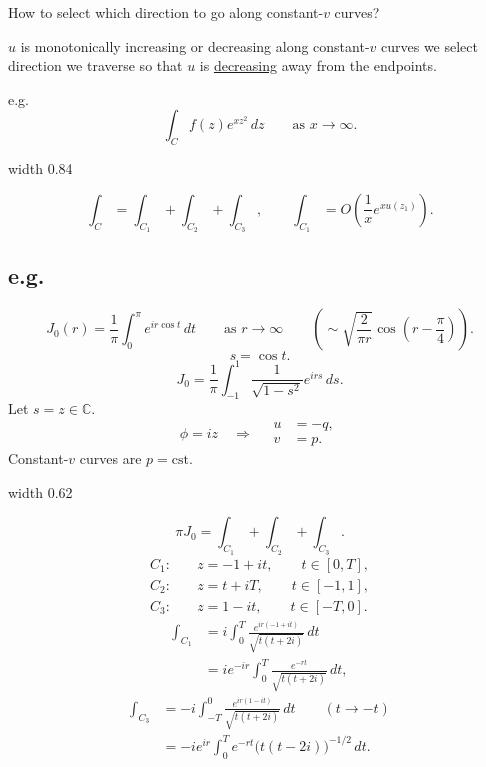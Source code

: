 \documentclass[11pt,a4paper]{article}
\begin{document}
\medskip
\noindent How to select which direction to go along constant-$v$ curves?

$u$ is monotonically increasing or decreasing along constant-$v$ curves
we select direction we traverse so that $u$ is \underline{decreasing}
away from the endpoints.

\clearpage
\medskip
\noindent e.g.
\[
    \int_C f(z)e^{xz^2}\,dz
    \qquad \text{as }x\to\infty.
\]
\begin{center}
    \pdfximage width 0.84\linewidth {figures/asymptotic-lecture9/source-06.png}
    \leavevmode\pdfrefximage\pdflastximage
\end{center}
\[
    \int_C=\int_{C_1}+\int_{C_2}+\int_{C_3},
    \qquad
    \int_{C_1}=O\!\left(\frac1x e^{xu(z_1)}\right).
\]

\clearpage
\subsection*{e.g.}
\[
    J_0(r)=\frac1\pi\int_0^\pi e^{ir\cos t}\,dt
    \qquad \text{as }r\to\infty
    \qquad
    \left(\sim\sqrt{\frac2{\pi r}}\cos\!\left(r-\frac\pi4\right)\right).
\]
\[
    s=\cos t.
\]
\[
    J_0=\frac1\pi\int_{-1}^1\frac1{\sqrt{1-s^2}}e^{irs}\,ds.
\]
Let $s=z\in\mathbb C$.
\[
    \phi=iz\quad\Rightarrow\quad
    \begin{aligned}
        u&=-q,\\
        v&=p.
    \end{aligned}
\]
Constant-$v$ curves are $p=\mathrm{cst}$.

\begin{center}
    \pdfximage width 0.62\linewidth {figures/asymptotic-lecture9/bessel-contour.png}
    \leavevmode\pdfrefximage\pdflastximage
\end{center}
\[
    \pi J_0=\int_{C_1}+\int_{C_2}+\int_{C_3}.
\]
\begin{align*}
    C_1:&\quad z=-1+it,\qquad t\in[0,T],\\
    C_2:&\quad z=t+iT,\qquad t\in[-1,1],\\
    C_3:&\quad z=1-it,\qquad t\in[-T,0].
\end{align*}
\begin{align*}
    \int_{C_1}
    &=i\int_0^T\frac{e^{ir(-1+it)}}{\sqrt{t(t+2i)}}\,dt\\
    &=i e^{-ir}\int_0^T\frac{e^{-rt}}{\sqrt{t(t+2i)}}\,dt,
\end{align*}
\begin{align*}
    \int_{C_3}
    &=-i\int_{-T}^0\frac{e^{ir(1-it)}}{\sqrt{t(t+2i)}}\,dt
    \qquad (t\to-t)\\
    &=-i e^{ir}\int_0^T e^{-rt}\bigl(t(t-2i)\bigr)^{-1/2}\,dt.
\end{align*}
\end{document}
